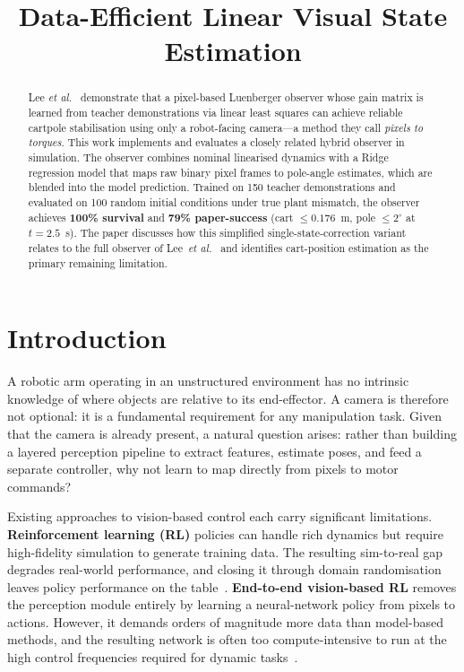 \documentclass[conference]{IEEEtran}
\title{Data-Efficient Linear Visual State Estimation}
\author{%
  \IEEEauthorblockN{Karthik Shivashankaran}
  \IEEEauthorblockA{
    New York University, New York, USA
  }
}
\begin{document}
\maketitle

\begin{abstract}
Lee \emph{et al.}~\cite{lee2024} demonstrate that a pixel-based Luenberger
observer whose gain matrix is learned from teacher demonstrations via linear
least squares can achieve reliable cartpole stabilisation using only a
robot-facing camera---a method they call \emph{pixels to torques}.
This work implements and evaluates a closely related hybrid observer in
simulation.  The observer combines nominal linearised dynamics with a Ridge
regression model that maps raw binary pixel frames to pole-angle estimates,
which are blended into the model prediction.  Trained on 150 teacher
demonstrations and evaluated on 100 random initial conditions under true plant
mismatch, the observer achieves \textbf{100\% survival} and \textbf{79\%
paper-success} (cart $\leq0.176$~m, pole $\leq2^\circ$ at $t=2.5$~s).
The paper discusses how this simplified single-state-correction variant relates
to the full observer of Lee~\emph{et al.}~\cite{lee2024} and identifies
cart-position estimation as the primary remaining limitation.
\end{abstract}

\section{Introduction}
\label{sec:intro}

A robotic arm operating in an unstructured environment has no intrinsic
knowledge of where objects are relative to its end-effector.  A camera is
therefore not optional: it is a fundamental requirement for any manipulation
task.  Given that the camera is already present, a natural question arises:
rather than building a layered perception pipeline to extract features, estimate
poses, and feed a separate controller, why not learn to map directly from pixels
to motor commands?

Existing approaches to vision-based control each carry significant limitations.
\textbf{Reinforcement learning (RL)} policies can handle rich dynamics but
require high-fidelity simulation to generate training data.  The resulting
sim-to-real gap degrades real-world performance, and closing it through domain
randomisation leaves policy performance on the
table~\cite{andrychowicz2020learning}.  \textbf{End-to-end vision-based RL}
removes the perception module entirely by learning a neural-network policy from
pixels to actions.  However, it demands orders of magnitude more data than
model-based methods, and the resulting network is often too compute-intensive to
run at the high control frequencies required for dynamic
tasks~\cite{levine2016end}.
\end{document}
